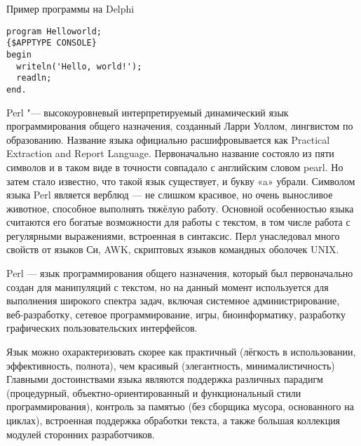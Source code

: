 \documentclass[14pt]{beamer}
\begin{document}
\begin{frame}[fragile]
\begin{block}{Пример программы на Delphi}
\begin{lstlisting}
program Helloworld;        
{$APPTYPE CONSOLE}           
begin
  writeln('Hello, world!');    
  readln;                    
end.   
\end{lstlisting}

\end{block}
\begin{center}
\hyperlink{menu}{}
\end{center}
\end{frame}



\begin{frame}[label=Perl,shrink=20]
\begin{block}{Perl "---}
высокоуровневый интерпретируемый динамический язык программирования общего назначения, созданный Ларри Уоллом, лингвистом по образованию. Название языка официально расшифровывается как Practical Extraction and Report Language. Первоначально название состояло из пяти символов и в таком виде в точности совпадало с английским словом pearl. Но затем стало известно, что такой язык существует, и букву «a» убрали. Символом языка Perl является верблюд — не слишком красивое, но очень выносливое животное, способное выполнять тяжёлую работу.
    Основной особенностью языка считаются его богатые возможности для работы с текстом, в том числе работа с регулярными выражениями, встроенная в синтаксис. Перл унаследовал много свойств от языков Си, AWK, скриптовых языков командных оболочек UNIX.
\end{block}
\end{frame}


\begin{frame}
\begin{block}

Perl — язык программирования общего назначения, который был первоначально создан для манипуляций с текстом, но на данный момент используется для выполнения широкого спектра задач, включая системное администрирование, веб-разработку, сетевое программирование, игры, биоинформатику, разработку графических пользовательских интерфейсов.
\end{block}
\end{frame}

\begin{frame}
\begin{block}

Язык можно охарактеризовать скорее как практичный (лёгкость в использовании, эффективность, полнота), чем красивый (элегантность, минималистичность) Главными достоинствами языка являются поддержка различных парадигм (процедурный, объектно-ориентированный и функциональный стили программирования), контроль за памятью (без сборщика мусора, основанного на циклах), встроенная поддержка обработки текста, а также большая коллекция модулей сторонних разработчиков.
\end{block}
\end{frame}
\end{document}
